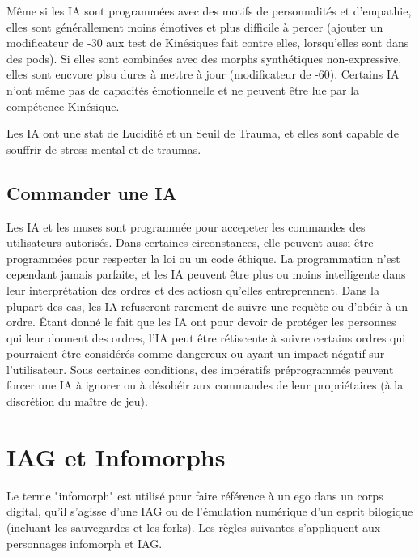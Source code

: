 Même si les IA sont programmées avec des motifs de personnalités et d'empathie, elles sont générallement moins émotives et plus difficile à percer (ajouter un modificateur de -30 aux test de Kinésiques fait contre elles, lorsqu'elles sont dans des pods). Si elles sont combinées avec des morphs synthétiques non-expressive, elles sont encvore plsu dures à mettre à jour (modificateur de -60). Certains IA n'ont même pas de capacités émotionnelle et ne peuvent être lue par la compétence Kinésique. 

Les IA ont une stat de Lucidité et un Seuil de Trauma, et elles sont capable de souffrir de stress mental et de traumas. 

\subsection{Commander une IA} 

Les IA et les muses sont programmée pour accepeter les commandes des utilisateurs autorisés. Dans certaines circonstances, elle peuvent aussi être programmées pour respecter la loi ou un code éthique. La programmation n'est cependant jamais parfaite, et les IA peuvent être plus ou moins intelligente dans leur interprétation des ordres et des actiosn qu'elles entreprennent. Dans la plupart des cas, les IA refuseront rarement de suivre une requète ou d'obéir à un ordre. Étant donné le fait que les IA ont pour devoir de protéger les personnes qui leur donnent des ordres, l'IA peut être rétiscente à suivre certains ordres qui pourraient être considérés comme dangereux ou ayant un impact négatif sur l'utilisateur. Sous certaines conditions, des impératifs préprogrammés peuvent forcer une IA à ignorer ou à désobéir aux commandes de leur propriétaires (à la discrétion du maître de jeu). 

\section{IAG et Infomorphs} 

Le terme "infomorph" est utilisé pour faire référence à un ego dans un corps digital, qu'il s'agisse d'une IAG ou de l'émulation numérique d'un esprit bilogique (incluant les sauvegardes et les forks). Les règles suivantes s'appliquent aux personnages infomorph et IAG. 



